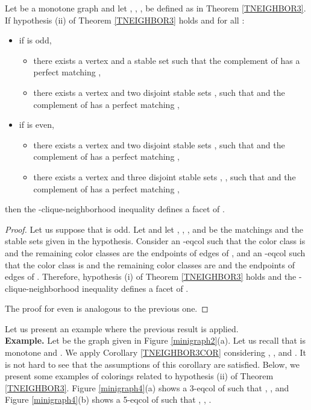 \begin{tcor} \label{TNEIGHBOR3COR}
Let  be a monotone graph and let , , ,  be defined as in Theorem \ref{TNEIGHBOR3}.
If hypothesis (ii) of Theorem \ref{TNEIGHBOR3} holds and for all :
\begin{itemize}
\item if  is odd,
\begin{itemize}
\item there exists a vertex  and a stable set  such that the complement of 
has a perfect matching ,
\item there exists a vertex  and two disjoint stable sets ,  such that
 and the complement of  has a perfect matching  ,
\end{itemize}
\item if  is even,
\begin{itemize}
\item there exists a vertex  and two disjoint stable sets ,  such that
 and the complement of  has a perfect matching ,
\item there exists a vertex  and three disjoint stable sets , , 
such that  and the complement of  has a perfect matching  ,
\end{itemize}
\end{itemize}
then the -clique-neighborhood inequality defines a facet of .
\end{tcor}
\begin{proof}
Let us suppose that  is odd.
Let  and let , , ,  and  be the matchings and the
stable sets given in the hypothesis. Consider an -eqcol such that the color class
 is  and the remaining color classes are the endpoints of edges of , and an
-eqcol such that the color class  is  and the remaining color classes are 
and the endpoints of edges of . Therefore, hypothesis (i) of Theorem \ref{TNEIGHBOR3} holds and
the -clique-neighborhood inequality defines a facet of .

The proof for  even is analogous to the previous one.
\end{proof}

Let us present an example where the previous result is applied.\\

\noindent \textbf{Example.} Let  be the graph given in Figure \ref{minigraph2}(a). Let us recall that  is
monotone and . We apply Corollary \ref{TNEIGHBOR3COR} considering , ,  and
. It is not hard to see that the assumptions of this corollary are satisfied.
Below, we present some examples of colorings related to hypothesis (ii) of Theorem \ref{TNEIGHBOR3}.
Figure \ref{minigraph4}(a) shows a 3-eqcol of  such that , ,  and
Figure \ref{minigraph4}(b) shows a 5-eqcol of  such that , , .


